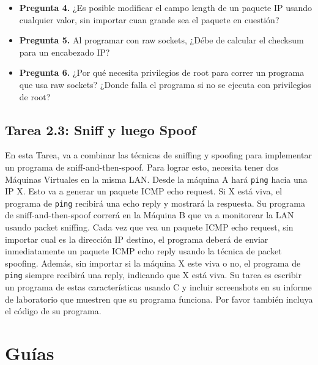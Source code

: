 \begin{itemize}
\item \textbf{Pregunta 4.}
¿Es posible modificar el campo length de un paquete IP usando cualquier valor, sin importar cuan grande sea el paquete en cuestión? 


\item \textbf{Pregunta 5.} 
Al programar con raw sockets, ¿Débe de calcular el checksum para un encabezado IP?

\item \textbf{Pregunta 6.} 
¿Por qué necesita privilegios de root para correr un programa que usa raw sockets? ¿Donde falla el programa si no se ejecuta con privilegios de root?

\end{itemize}
 


\subsection{Tarea 2.3: Sniff y luego Spoof}

En esta Tarea, va a combinar las técnicas de sniffing y spoofing para implementar un programa de sniff-and-then-spoof.
Para lograr esto, necesita tener dos Máquinas Virtuales en la misma LAN. Desde la máquina A hará {\tt ping} hacia una IP X. Esto va a generar un paquete  ICMP echo 
request. Si X está viva, el programa de {\tt ping} recibirá una echo reply y mostrará la respuesta. Su programa de sniff-and-then-spoof correrá en la Máquina B que va a monitorear la LAN usando packet sniffing. Cada vez que vea un paquete ICMP echo request, sin importar cual es la dirección IP destino, el programa deberá de enviar inmediatamente un paquete ICMP echo reply usando la técnica de packet spoofing. Además, sin importar si la máquina X este viva o no, el programa de {\tt ping} siempre recibirá una reply, indicando que X está viva. Su tarea es escribir un programa de estas características usando C y incluir screenshots en su informe de laboratorio que muestren que su programa funciona. Por favor también incluya el código de su programa.



\section{Guías} 



